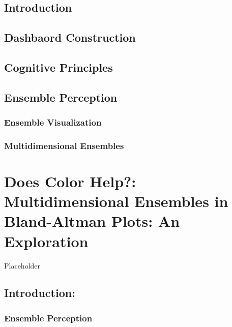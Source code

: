 \documentclass[print]{nuthesis}
\begin{document}
\hypertarget{introduction-2}{%
\section{Introduction}\label{introduction-2}}

\hypertarget{dashbaord-construction}{%
\section{Dashbaord Construction}\label{dashbaord-construction}}

\hypertarget{cognitive-principles}{%
\section{Cognitive Principles}\label{cognitive-principles}}

\hypertarget{ensemble-perception}{%
\section{Ensemble Perception}\label{ensemble-perception}}

\hypertarget{ensemble-visualization}{%
\subsection{Ensemble Visualization}\label{ensemble-visualization}}

\hypertarget{multidimensional-ensembles}{%
\subsection{Multidimensional Ensembles}\label{multidimensional-ensembles}}

\hypertarget{ref-labels}{%
\chapter{Does Color Help?: Multidimensional Ensembles in Bland-Altman Plots: An Exploration}\label{ref-labels}}

Placeholder

\hypertarget{introduction-3}{%
\section{Introduction:}\label{introduction-3}}

\hypertarget{ensemble-perception-1}{%
\subsection{Ensemble Perception}\label{ensemble-perception-1}}
\end{document}
